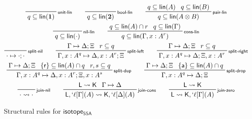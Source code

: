 \documentclass[acmsmall,screen,review]{acmart}
\newcommand{\ms}[1]{\ensuremath{\mathsf{#1}}}
\newcommand{\lbl}[1]{{`#1}}
\newcommand{\csplits}[3]{#1 \mapsto #2;#3}
\newcommand{\cwk}[2]{#1 \mapsto #2}
\newcommand{\lwk}[2]{#1 \rightsquigarrow #2}
\newcommand{\tlin}[2]{#2 \subseteq \ms{lin}(#1)}
\newcommand{\ltlin}[3]{#3 \subseteq \ms{lin}(#1) \cap #2}
\newcommand{\thyp}[3]{#1: {#2}^{#3}}
\newcommand{\lhyp}[3]{#1[#2](#3)}
\newcommand{\llhyp}[3]{\lhyp{\lbl{#1}}{#2}{#3}}
\newcommand{\rle}[1]{{\scriptsize\textsf{#1}}}
\newcommand{\taff}{{\{\ms{a}\}}}
\newcommand{\trel}{{\{\ms{r}\}}}
\newcommand{\isotopessa}{\ms{isotope_{SSA}}}
\begin{document}
\begin{figure}
  \begin{gather*}    
    \prftree[r]{\rle{unit-lin}}{}{\tlin{\mathbf{1}}{q}} 
    \qquad
    \prftree[r]{\rle{bool-lin}}{}{\tlin{\mathbf{2}}{q}} 
    \qquad
    \prftree[r]{\rle{pair-lin}}{\tlin{A}{q}}{\tlin{B}{q}}{\tlin{A \otimes B}{q}} \\
    \prftree[r]{\rle{nil-lin}}{\tlin{\cdot}{q}} \qquad
    \prftree[r]{\rle{cons-lin}}{\ltlin{A}{r}{q}}{\tlin{\Gamma}{q}}
      {\tlin{\Gamma, \thyp{x}{A}{r}}{q}} \\
    \prftree[r]{\rle{split-nil}}{\csplits{\cdot}{\cdot}{\cdot}} \qquad
    \prftree[r]{\rle{split-left}}
      {\csplits{\Gamma}{\Delta}{\Xi}}
      {r \subseteq q}
      {\csplits{\Gamma, \thyp{x}{A}{q}}{\Delta, \thyp{x}{A}{r}}{\Xi}} \qquad
    \prftree[r]{\rle{split-right}}
      {\csplits{\Gamma}{\Delta}{\Xi}}
      {r \subseteq q}
      {\csplits{\Gamma, \thyp{x}{A}{q}}{\Delta}{\Xi, \thyp{x}{A}{r}}} \\
    \prftree[r]{\rle{split-dup}}
      {\csplits{\Gamma}{\Delta}{\Xi}}
      {\ltlin{A}{q}{\trel}}
      {r, s \subseteq q}
      {\csplits{\Gamma, \thyp{x}{A}{q}}{\Delta, \thyp{x}{A}{r}}{\Xi, \thyp{x}{A}{s}}}
      \qquad
    \prftree[r]{\rle{split-drop}}
      {\csplits{\Gamma}{\Delta}{\Xi}}
      {\ltlin{A}{q}{\taff}}
      {\csplits{\Gamma, \thyp{x}{A}{q}}{\Delta}{\Xi}}
      \\
    \prftree[r]{\rle{join-nil}}{\lwk{\cdot}{\cdot}} \qquad
    \prftree[r]{\rle{join-cons}}
      {\lwk{\ms{L}}{\ms{K}}}
      {\cwk{\Gamma}{\Delta}}
      {\lwk{\ms{L}, \llhyp{\ell}{\Gamma}{A}}{\ms{K}, \llhyp{\ell}{\Delta}{A}}} 
      \qquad
    \prftree[r]{\rle{join-zero}}
      {\lwk{\ms{L}}{\ms{K}}}
      {\lwk{\ms{L}}{\ms{K}, \llhyp{\ell}{\Gamma}{A}}} 
  \end{gather*}
  \caption{Structural rules for \isotopessa}
  \label{fig:ssa-structural}
\end{figure}
\end{document}
